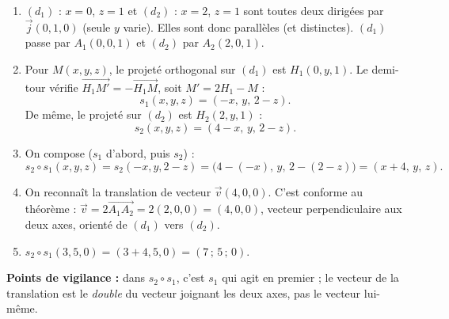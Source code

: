 \documentclass[11pt]{article}
\newcommand{\cle}[1]{{\popxbold\color{popdark}#1}}
\begin{document}
\begin{corrige}
\begin{enumerate}
\item $(d_1)$ : $x=0$, $z=1$ et $(d_2)$ : $x=2$, $z=1$ sont toutes deux dirigées par $\vec{j}(0,1,0)$ (seule $y$ varie). Elles sont donc \cle{parallèles} (et distinctes). $(d_1)$ passe par $A_1(0,0,1)$ et $(d_2)$ par $A_2(2,0,1)$.
\item Pour $M(x,y,z)$, le projeté orthogonal sur $(d_1)$ est $H_1(0,y,1)$. Le demi-tour vérifie $\overrightarrow{H_1M'}=-\overrightarrow{H_1M}$, soit $M'=2H_1-M$ :
\[ s_1(x,y,z)=(-x,\,y,\,2-z). \]
De même, le projeté sur $(d_2)$ est $H_2(2,y,1)$ :
\[ s_2(x,y,z)=(4-x,\,y,\,2-z). \]
\item On compose ($s_1$ d'abord, puis $s_2$) :
\[ s_2\circ s_1(x,y,z)=s_2(-x,y,2-z)=\bigl(4-(-x),\,y,\,2-(2-z)\bigr)=(x+4,\,y,\,z). \]
\item On reconnaît la \cle{translation} de vecteur $\vec{v}(4,0,0)$. C'est conforme au théorème : $\vec{v}=2\overrightarrow{A_1A_2}=2(2,0,0)=(4,0,0)$, vecteur perpendiculaire aux deux axes, orienté de $(d_1)$ vers $(d_2)$.
\item $s_2\circ s_1(3,5,0)=(3+4,5,0)=(7\,;\,5\,;\,0)$.
\end{enumerate}
\textbf{Points de vigilance :} dans $s_2\circ s_1$, c'est $s_1$ qui agit en premier ; le vecteur de la translation est le \emph{double} du vecteur joignant les deux axes, pas le vecteur lui-même.
\end{corrige}
\end{document}
